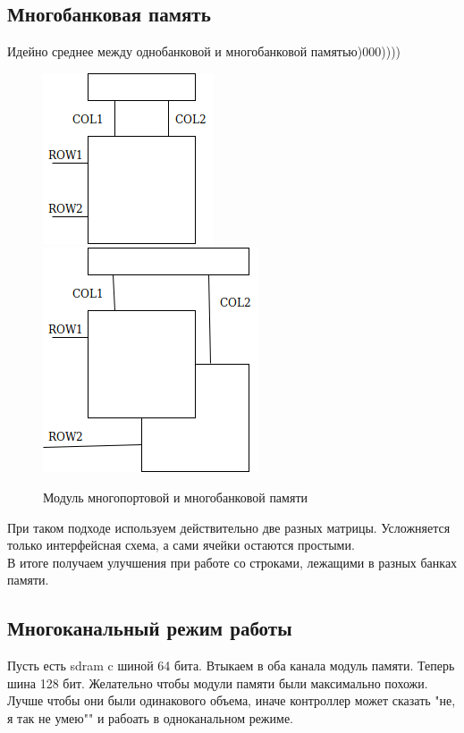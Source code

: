 \documentclass[12pt, a4paper]{article}
\begin{document}
\subsection{Многобанковая память}
Идейно среднее между однобанковой и многобанковой памятью)000))))\\
\begin{figure}[h]
    \centering
    \includegraphics[scale=0.45]{./images/MultiportMEM.png}
    \includegraphics[scale=0.45]{./images/MultibankMEM.png}
    \caption{Модуль многопортовой и многобанковой памяти}
    \label{fig:MultiportMEM}
\end{figure}
При таком подходе используем действительно две разных матрицы. Усложняется только интерфейсная схема, а сами ячейки остаются простыми.\\
В итоге получаем улучшения при работе со строками, лежащими в разных банках памяти.
\subsection{Многоканальный режим работы}
Пусть есть sdram c шиной 64 бита.
Втыкаем в оба канала модуль памяти. Теперь шина 128 бит.
Желательно чтобы модули памяти были максимально похожи. Лучше чтобы они были одинакового объема, иначе контроллер может сказать "не, я так не умею"" и рабоать в одноканальном режиме. 
\end{document}
